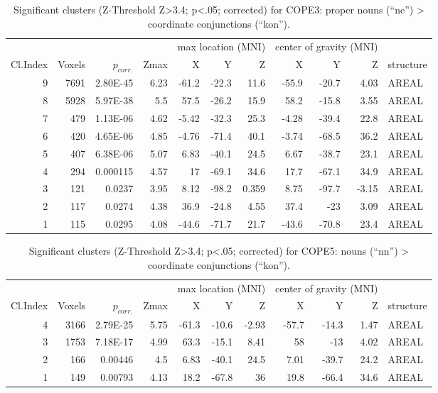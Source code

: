 \documentclass[10pt,a4paper,twocolumn]{article}
\begin{document}
\begin{table*}[t]
\caption{Significant clusters (Z-Threshold Z>3.4; p<.05; corrected) for COPE3: proper nouns (``ne'') > coordinate conjunctions (``kon'').}
\begin{tabular}{rrrrrrrrrrp{3cm}}
\toprule
& & & & \multicolumn{3}{r}{max location (MNI)} & \multicolumn{3}{r}{center of gravity (MNI)} &
\\ \cmidrule{5-7} \cmidrule{8-10}
Cl.\-Index & Voxels & $p_{corr.}$ & Z\-max & X & Y & Z  & X & Y & Z & structure \\
\midrule
9 & 7691 & 2.80E-45 & 6.23 & -61.2 & -22.3 & 11.6 & -55.9 & -20.7 & 4.03 & AREAL \\
8 & 5928 & 5.97E-38 & 5.5 & 57.5 & -26.2 & 15.9 & 58.2 & -15.8 & 3.55 & AREAL \\
7 & 479 & 1.13E-06 & 4.62 & -5.42 & -32.3 & 25.3 & -4.28 & -39.4 & 22.8 & AREAL \\
6 & 420 & 4.65E-06 & 4.85 & -4.76 & -71.4 & 40.1 & -3.74 & -68.5 & 36.2 & AREAL \\
5 & 407 & 6.38E-06 & 5.07 & 6.83 & -40.1 & 24.5 & 6.67 & -38.7 & 23.1 & AREAL \\
4 & 294 & 0.000115 & 4.57 & 17 & -69.1 & 34.6 & 17.7 & -67.1 & 34.9 & AREAL \\
3 & 121 & 0.0237 & 3.95 & 8.12 & -98.2 & 0.359 & 8.75 & -97.7 & -3.15 & AREAL \\
2 & 117 & 0.0274 & 4.38 & 36.9 & -24.8 & 4.55 & 37.4 & -23 & 3.09 & AREAL \\
1 & 115 & 0.0295 & 4.08 & -44.6 & -71.7 & 21.7 & -43.6 & -70.8 & 23.4 & AREAL \\
\bottomrule
\end{tabular}
\label{tab:cope3}
\end{table*}


\begin{table*}[t]
    \caption{Significant clusters (Z-Threshold Z>3.4; p<.05; corrected) for COPE5: nouns (``nn'') > coordinate conjunctions (``kon'').}
\begin{tabular}{rrrrrrrrrrp{3cm}}
\toprule
& & & & \multicolumn{3}{r}{max location (MNI)} & \multicolumn{3}{r}{center of gravity (MNI)} &
\\ \cmidrule{5-7} \cmidrule{8-10}
Cl.\-Index & Voxels & $p_{corr.}$ & Z\-max & X & Y & Z  & X & Y & Z & structure \\
\midrule
4 & 3166 & 2.79E-25 & 5.75 & -61.3 & -10.6 & -2.93 & -57.7 & -14.3 & 1.47 & AREAL \\
3 & 1753 & 7.18E-17 & 4.99 & 63.3 & -15.1 & 8.41 & 58 & -13 & 4.02 & AREAL \\
2 & 166 & 0.00446 & 4.5 & 6.83 & -40.1 & 24.5 & 7.01 & -39.7 & 24.2 & AREAL \\
1 & 149 & 0.00793 & 4.13 & 18.2 & -67.8 & 36 & 19.8 & -66.4 & 34.6 & AREAL \\
\bottomrule
\end{tabular}
\label{tab:cope5}
\end{table*}
\end{document}
